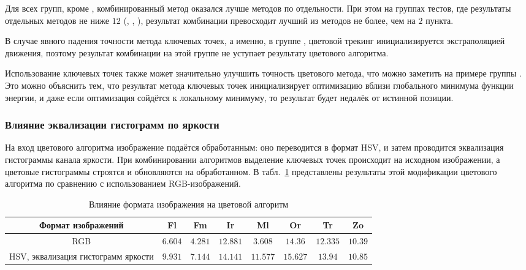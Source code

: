 
Для всех групп, кроме , комбинированный метод оказался лучше методов по отдельности. 
При этом на группах тестов, где результаты отдельных методов не ниже $12$ (, , ), результат комбинации превосходит лучший из методов не более, чем на $2$ пункта. 

В случае явного падения точности метода ключевых точек, а именно, в группе , цветовой трекинг инициализируется экстраполяцией движения, поэтому результат комбинации на этой группе не уступает результату цветового алгоритма.

Использование ключевых точек также может значительно улучшить точность цветового метода, что можно заметить на примере группы . 
Это можно объяснить тем, что результат метода ключевых точек инициализирует оптимизацию вблизи глобального минимума функции энергии, и даже если оптимизация сойдётся к локальному минимуму, то результат будет недалёк от истинной позиции.


\subsubsection{Влияние эквализации гистограмм по яркости}

На вход цветового алгоритма изображение подаётся обработанным: оно переводится в формат HSV, и затем проводится эквализация гистограммы канала яркости. 
При комбинировании алгоритмов выделение ключевых точек происходит на исходном изображении, а цветовые гистограммы строятся и обновляются на обработанном.
В табл.~\ref{tab:hsv_slsqp} представлены результаты этой модификации цветового алгоритма по сравнению с использованием RGB-изображений.

\begin{table}[h]
\caption{\label{tab:hsv_slsqp}Влияние формата изображения на цветовой алгоритм}
\begin{center}
\begin{tabular}{|c|c|c|c|c|c|c|c|}
\hline
Формат изображений                          & Fl           & Fm          & Ir            & Ml           & Or           & Tr          & Zo  \\
\hline
RGB                                                     & $6.604$  & $4.281$   & $12.881$ & $3.608$ & $14.36$ & $12.335$  & $10.39$ \\
\hline
HSV, эквализация гистограмм яркости & $9.931$  & $7.144$   & $14.141$ & $11.577$ & $15.627$ & $13.94$  & $10.85$ \\
\hline
\end{tabular}
\end{center}
\end{table}

